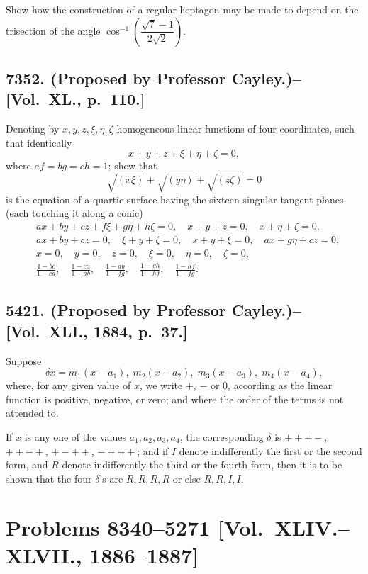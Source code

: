 \documentclass[11pt,a4paper]{book}
\begin{document}
Show how the construction of a regular heptagon may be made to depend on the trisection of the angle $\cos^{-1}\left(\dfrac{\sqrt{7}-1}{2\sqrt{2}}\right)$.

\subsection*{7352. (Proposed by Professor Cayley.)\---[Vol.~XL., p.~110.]}

Denoting by $x,y,z,\xi,\eta,\zeta$ homogeneous linear functions of four coordinates, such that identically
\[
x+y+z+\xi+\eta+\zeta = 0,
\]
where $af=bg=ch=1$; show that
\[
\sqrt{(x\xi)} + \sqrt{(y\eta)} + \sqrt{(z\zeta)} = 0
\]
is the equation of a quartic surface having the sixteen singular tangent planes (each touching it along a conic)
\[
\begin{aligned}
&ax+by+cz+f\xi+g\eta+h\zeta=0, \quad x+y+z=0, \quad x+\eta+\zeta=0, \\
&ax+by+cz=0, \quad \xi+y+\zeta=0, \quad x+y+\xi=0, \quad ax+g\eta+cz=0, \\
&x=0, \quad y=0, \quad z=0, \quad \xi=0, \quad \eta=0, \quad \zeta=0, \\
&\frac{1-bc}{1-ca}, \quad \frac{1-ca}{1-ab}, \quad \frac{1-ab}{1-fg}, \quad \frac{1-gh}{1-hf}, \quad \frac{1-hf}{1-fg}.
\end{aligned}
\]

\subsection*{5421. (Proposed by Professor Cayley.)\---[Vol.~XLI., 1884, p.~37.]}

Suppose
\[
\delta x = m_1(x-a_1), \; m_2(x-a_2), \; m_3(x-a_3), \; m_4(x-a_4),
\]
where, for any given value of $x$, we write $+$, $-$ or $0$, according as the linear function is positive, negative, or zero; and where the order of the terms is not attended to.

If $x$ is any one of the values $a_1, a_2, a_3, a_4$, the corresponding $\delta$ is $+++-$, $++-+$, $+-++$, $-+++$; and if $I$ denote indifferently the first or the second form, and $R$ denote indifferently the third or the fourth form, then it is to be shown that the four $\delta$'s are $R,R,R,R$ or else $R,R,I,I$.

\newpage

\section*{Problems 8340--5271 [Vol.~XLIV.--XLVII., 1886--1887]}
\end{document}
